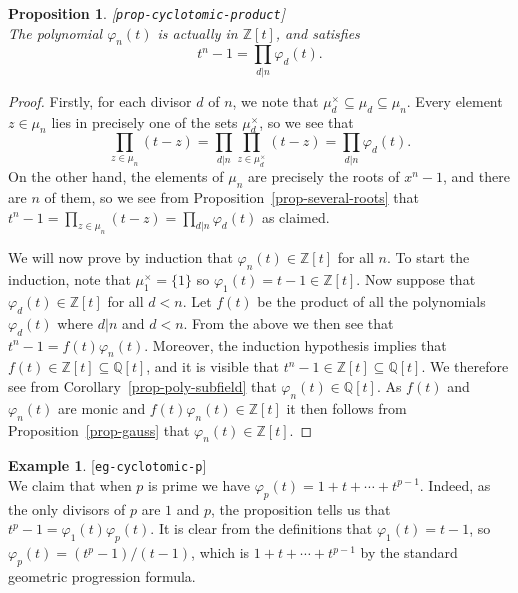 \documentclass{amsart}
\newcommand{\lbl}[1]{\label{#1}\textup{[\texttt{#1}]}\ \\}
\newcommand{\lbl}{\label}
\newcommand{\Z}         {{\mathbb{Z}}}
\newcommand{\Q}         {{\mathbb{Q}}}
\newcommand{\vph}       {\varphi}
\newcommand{\tm}        {\times}
\newcommand{\sse}       {\subseteq}
\renewcommand{\:}{\colon}
\newtheorem{proposition}[theorem]{Proposition}
\theoremstyle{definition}
\newtheorem{example}[theorem]{Example}
\begin{document}
\begin{proposition}\lbl{prop-cyclotomic-product}
 The polynomial $\vph_n(t)$ is actually in $\Z[t]$, and satisfies
 \[ t^n-1 = \prod_{d|n} \vph_d(t). \]
\end{proposition}
\begin{proof}
 Firstly, for each divisor $d$ of $n$, we note that
 $\mu_d^\tm\sse\mu_d\sse\mu_n$.  Every element $z\in\mu_n$ lies in
 precisely one of the sets $\mu_d^\tm$, so we see that
 \[ \prod_{z\in\mu_n}(t-z) = 
    \prod_{d|n} \prod_{z\in\mu_d^\tm}(t-z) =
    \prod_{d|n} \vph_d(t).
 \] 
 On the other hand, the elements of $\mu_n$ are precisely the roots of
 $x^n-1$, and there are $n$ of them, so we see from
 Proposition~\ref{prop-several-roots} that
 $t^n-1=\prod_{z\in\mu_n}(t-z)=\prod_{d|n}\vph_d(t)$ as claimed.  

 We will now prove by induction that $\vph_n(t)\in\Z[t]$ for all $n$.
 To start the induction, note that $\mu_1^\tm=\{1\}$ so
 $\vph_1(t)=t-1\in\Z[t]$.  Now suppose that $\vph_d(t)\in\Z[t]$ for
 all $d<n$.  Let $f(t)$ be the product of all the polynomials
 $\vph_d(t)$ where $d|n$ and $d<n$.  From the above we then see that
 $t^n-1=f(t)\vph_n(t)$.  Moreover, the induction hypothesis implies
 that $f(t)\in\Z[t]\sse\Q[t]$, and it is visible that
 $t^n-1\in\Z[t]\sse\Q[t]$.  We therefore see from
 Corollary~\ref{prop-poly-subfield} that $\vph_n(t)\in\Q[t]$.  As
 $f(t)$ and $\vph_n(t)$ are monic and $f(t)\vph_n(t)\in\Z[t]$ it then
 follows from Proposition~\ref{prop-gauss} that $\vph_n(t)\in\Z[t]$.
\end{proof}

\begin{example}\lbl{eg-cyclotomic-p}
 We claim that when $p$ is prime we have
 $\vph_p(t)=1+t+\dotsb+t^{p-1}$.  Indeed, as the only divisors of $p$
 are $1$ and $p$, the proposition tells us that
 $t^p-1=\vph_1(t)\vph_p(t)$.  It is clear from the definitions that
 $\vph_1(t)=t-1$, so $\vph_p(t)=(t^p-1)/(t-1)$, which is
 $1+t+\dotsb+t^{p-1}$ by the standard geometric progression formula.
\end{example}
\end{document}
